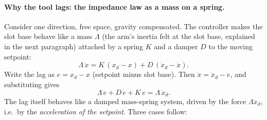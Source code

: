 \paragraph{Why the tool lags: the impedance law as a mass on a spring.} Consider one direction, free space,
gravity compensated. The controller makes the slot base behave like a mass $\Lambda$ (the arm's inertia felt at the
slot base, explained in the next paragraph) attached by a spring $K$ and a damper $D$ to the moving setpoint:
\begin{equation}
  \Lambda\,\ddot x = K\,(x_d - x) + D\,(\dot x_d - \dot x).
\end{equation}
Write the lag as $e = x_d - x$ (setpoint minus slot base). Then $\ddot x = \ddot x_d - \ddot e$, and substituting gives
\begin{equation}
  \Lambda\,\ddot e + D\,\dot e + K\,e = \Lambda\,\ddot x_d.
  \label{eq:al-error}
\end{equation}
The lag itself behaves like a damped mass-spring system, driven by the force $\Lambda \ddot x_d$, i.e.\ by the
\emph{acceleration of the setpoint}. Three cases follow:
